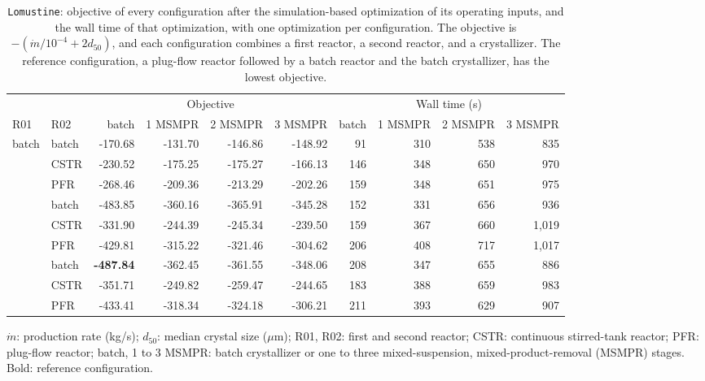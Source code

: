 \begin{table}[htbp]
\centering
\caption{\texttt{Lomustine}: objective of every configuration after the simulation-based optimization of its operating inputs, and the wall time of that optimization, with one optimization per configuration.
The objective is \(-(\dot m/10^{-4}+2d_{50})\), and each configuration combines a first reactor, a second reactor, and a crystallizer.
The reference configuration, a plug-flow reactor followed by a batch reactor and the batch crystallizer, has the lowest objective.}
\label{tab:supp-lomustine}
\footnotesize
\setlength{\tabcolsep}{3.5pt}
\begin{threeparttable}
\begin{tabular}{@{}llrrrrrrrr@{}}\toprule
 & & \multicolumn{4}{c}{Objective} & \multicolumn{4}{c}{Wall time (s)}\\\cmidrule(lr){3-6}\cmidrule(l){7-10}
R01 & R02 & batch & 1 MSMPR & 2 MSMPR & 3 MSMPR & batch & 1 MSMPR & 2 MSMPR & 3 MSMPR\\\midrule
\multirow{3}{*}{batch} & batch & -170.68 & -131.70 & -146.86 & -148.92 & 91 & 310 & 538 & 835 \\
 & CSTR & -230.52 & -175.25 & -175.27 & -166.13 & 146 & 348 & 650 & 970 \\
 & PFR & -268.46 & -209.36 & -213.29 & -202.26 & 159 & 348 & 651 & 975 \\
\addlinespace[2pt]
\multirow{3}{*}{CSTR} & batch & -483.85 & -360.16 & -365.91 & -345.28 & 152 & 331 & 656 & 936 \\
 & CSTR & -331.90 & -244.39 & -245.34 & -239.50 & 159 & 367 & 660 & 1{,}019 \\
 & PFR & -429.81 & -315.22 & -321.46 & -304.62 & 206 & 408 & 717 & 1{,}017 \\
\addlinespace[2pt]
\multirow{3}{*}{PFR} & batch & \textbf{-487.84} & -362.45 & -361.55 & -348.06 & 208 & 347 & 655 & 886 \\
 & CSTR & -351.71 & -249.82 & -259.47 & -244.65 & 183 & 388 & 659 & 983 \\
 & PFR & -433.41 & -318.34 & -324.18 & -306.21 & 211 & 393 & 629 & 907 \\
\bottomrule
\end{tabular}
\begin{tablenotes}[flushleft]\footnotesize
\item \(\dot m\): production rate (kg/s); \(d_{50}\): median crystal size (\(\mu\)m); R01, R02: first and second reactor; CSTR: continuous stirred-tank reactor; PFR: plug-flow reactor; batch, 1 to 3 MSMPR: batch crystallizer or one to three mixed-suspension, mixed-product-removal (MSMPR) stages.
Bold: reference configuration.
\end{tablenotes}
\end{threeparttable}
\end{table}
\FloatBarrier

